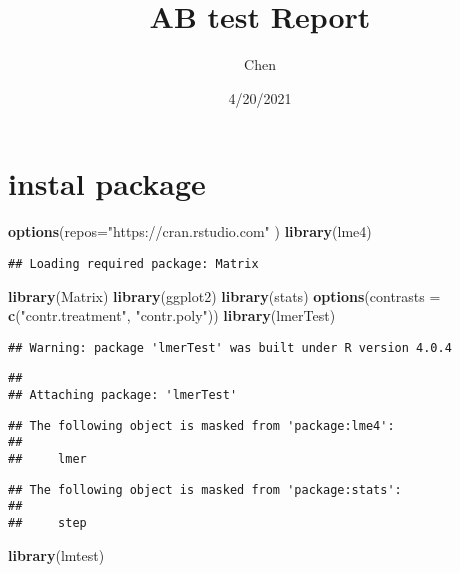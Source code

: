 \documentclass[
]{article}
\title{AB test Report}
\author{Chen}
\date{4/20/2021}
\newenvironment{Shaded}{\begin{snugshade}}{\end{snugshade}}
\newcommand{\DataTypeTok}[1]{\textcolor[rgb]{0.13,0.29,0.53}{#1}}
\newcommand{\KeywordTok}[1]{\textcolor[rgb]{0.13,0.29,0.53}{\textbf{#1}}}
\newcommand{\NormalTok}[1]{#1}
\newcommand{\StringTok}[1]{\textcolor[rgb]{0.31,0.60,0.02}{#1}}
\begin{document}
\maketitle

\hypertarget{instal-package}{%
\section{instal package}\label{instal-package}}

\begin{Shaded}
\begin{Highlighting}[]
\KeywordTok{options}\NormalTok{(}\DataTypeTok{repos=}\StringTok{"https://cran.rstudio.com"}\NormalTok{ )}
\KeywordTok{library}\NormalTok{(lme4)}
\end{Highlighting}
\end{Shaded}

\begin{verbatim}
## Loading required package: Matrix
\end{verbatim}

\begin{Shaded}
\begin{Highlighting}[]
\KeywordTok{library}\NormalTok{(Matrix)}
\KeywordTok{library}\NormalTok{(ggplot2)}
\KeywordTok{library}\NormalTok{(stats)}
\KeywordTok{options}\NormalTok{(}\DataTypeTok{contrasts =} \KeywordTok{c}\NormalTok{(}\StringTok{"contr.treatment"}\NormalTok{, }\StringTok{"contr.poly"}\NormalTok{))}
\KeywordTok{library}\NormalTok{(lmerTest)}
\end{Highlighting}
\end{Shaded}

\begin{verbatim}
## Warning: package 'lmerTest' was built under R version 4.0.4
\end{verbatim}

\begin{verbatim}
## 
## Attaching package: 'lmerTest'
\end{verbatim}

\begin{verbatim}
## The following object is masked from 'package:lme4':
## 
##     lmer
\end{verbatim}

\begin{verbatim}
## The following object is masked from 'package:stats':
## 
##     step
\end{verbatim}

\begin{Shaded}
\begin{Highlighting}[]
\KeywordTok{library}\NormalTok{(lmtest)}
\end{Highlighting}
\end{Shaded}
\end{document}
